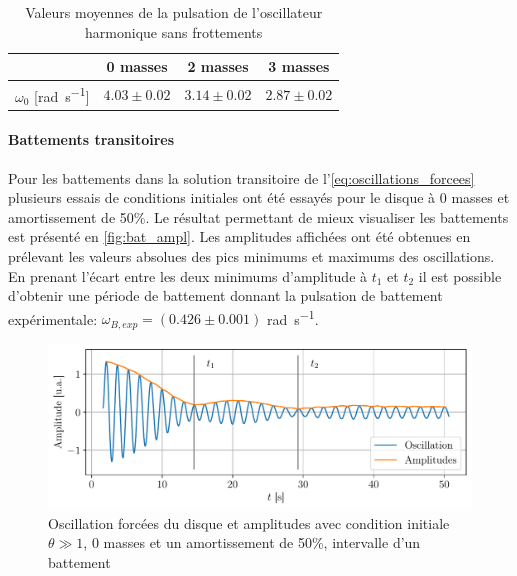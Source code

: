 \begin{table}[h]
    \centering
    \begin{tabulary}{0.9\linewidth}{C C C C}
        \toprule
        & 0 masses & 2 masses & 3 masses \\
        \midrule
        \(\omega_0\) [\si{\radian\per\second}] & \(4.03 \pm 0.02\) & \(3.14 \pm 0.02\) & \(2.87 \pm 0.02\) \\
        \bottomrule
    \end{tabulary}
    \caption{Valeurs moyennes de la pulsation de l'oscillateur harmonique sans frottements}
    \label{tab:omega0_libre}
\end{table}

\paragraph{Battements transitoires}
Pour les battements dans la solution transitoire de l'\autoref{eq:oscillations_forcees} plusieurs essais de conditions initiales ont été essayés pour le disque à 0 masses et amortissement de 50\%. Le résultat permettant de mieux visualiser les battements est présenté en \autoref{fig:bat_ampl}. Les amplitudes affichées ont été obtenues en prélevant les valeurs absolues des pics minimums et maximums des oscillations. En prenant l'écart entre les deux minimums d'amplitude à $t_1$ et $t_2$ il est possible d'obtenir une période de battement donnant la pulsation de battement expérimentale: $\omega_{B,exp} = (0.426 \pm 0.001)
$ \si{\radian\per\second}.
\begin{figure}[h]
    \centering
    \includegraphics[width=0.9\linewidth]{figures/bat_ampl.pdf}
    \caption{Oscillation forcées du disque et amplitudes avec condition initiale $\theta \gg 1$, 0 masses et un amortissement de 50\%, intervalle d'un battement}
    \label{fig:bat_ampl}
\end{figure}

